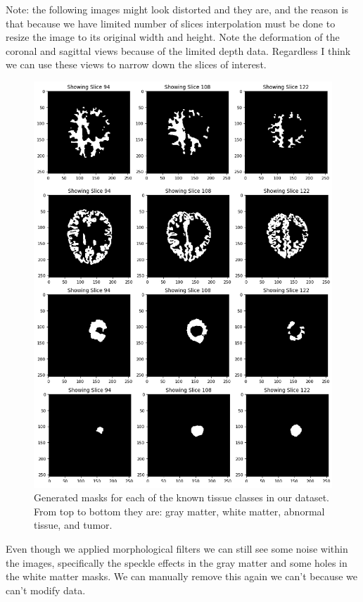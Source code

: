 Note: the following images might look distorted and they are, and the reason is that because we have limited number of slices interpolation must be done to resize the image to its original width and height. Note the deformation of the coronal and sagittal views because of the limited depth data. Regardless I think we can use these views to narrow down the slices of interest.

\begin{figure}[H]
  \centering
  \includegraphics[width=\linewidth]{img/resultantMasks.png}
  \caption{Generated masks for each of the known tissue classes in our dataset.  From top to bottom they are: gray matter, white matter, abnormal tissue, and tumor.}
  \label{fig:resultantMasks}
\end{figure}

Even though we applied morphological filters we can still see some noise within the images, specifically the speckle effects in the gray matter and some holes in the white matter masks.  We can manually remove this again we can't because we can't modify data.

